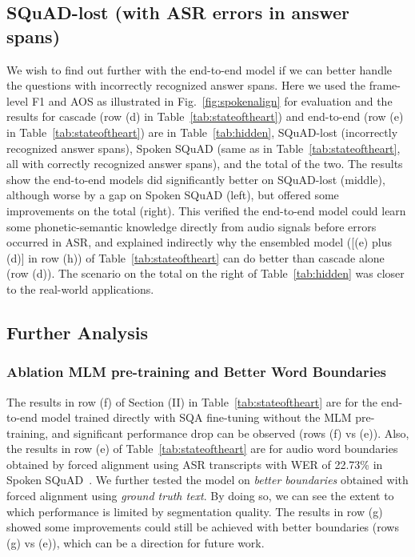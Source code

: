 \documentclass[a4paper]{article}
\begin{document}
\vspace{-5pt}
\subsection{SQuAD-lost (with ASR errors in answer spans)} 
\label{ssec:ensemble}
\vspace{-5pt}

We wish to find out further with the end-to-end model if we can better handle the questions with incorrectly recognized answer spans. Here we used the frame-level F1 and AOS as illustrated in Fig.~\ref{fig:spokenalign} for evaluation and the results for cascade (row (d) in Table~\ref{tab:stateoftheart}) and end-to-end (row (e) in Table~\ref{tab:stateoftheart}) are in Table~\ref{tab:hidden},  SQuAD-lost  (incorrectly recognized answer spans), Spoken SQuAD (same as in Table~\ref{tab:stateoftheart}, all with correctly recognized answer spans), and the total of the two. The results show the end-to-end models did significantly better on SQuAD-lost (middle), although worse by a gap on Spoken SQuAD (left), but offered some improvements on the total (right). This verified the end-to-end model could learn some phonetic-semantic knowledge directly from audio signals before errors occurred in ASR, and explained indirectly why the ensembled model ([(e) plus (d)] in row (h)) of Table~\ref{tab:stateoftheart} can do better than cascade alone (row (d)). The scenario on the total on the right of Table~\ref{tab:hidden} was closer to the real-world applications.

\vspace{-5pt}
\subsection{Further Analysis} 
\vspace{-5pt}
\label{ssec:abs}

\subsubsection{Ablation MLM pre-training and Better Word Boundaries}
\vspace{-5pt}

The results in row (f) of Section (II) in Table~\ref{tab:stateoftheart} are for the end-to-end model trained directly with SQA fine-tuning without the MLM pre-training, and significant performance drop can be observed (rows (f) vs (e)). Also, the results in row (e) of Table~\ref{tab:stateoftheart} are for audio word boundaries obtained by forced alignment using ASR transcripts with WER of 22.73\% in Spoken SQuAD~\cite{Lee2018spoken}. We further tested the model on \emph{better boundaries} obtained with forced alignment using 
\emph{ground truth text}. By doing so, we can see the extent to which performance is limited by segmentation quality. The results in row (g) showed some improvements could still be achieved with better boundaries (rows (g) vs (e)), which can be a direction for future work.
\end{document}
